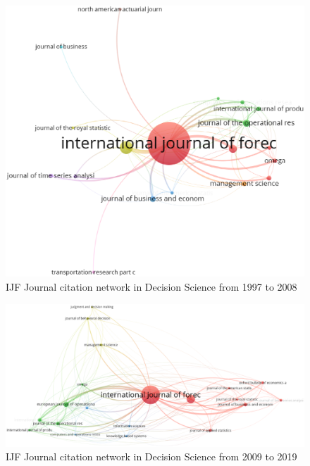\documentclass[11pt,a4paper]{elsarticle} %
\begin{document}
\begin{figure}[htbp]
\centering
\includegraphics[scale=0.4]{fig.15.eps}
\caption{IJF Journal citation network in Decision Science from 1997 to 2008}
\end{figure}

\begin{figure}[htbp]
\centering
\includegraphics[scale=0.3]{fig.16.eps}
\caption{IJF Journal citation network in Decision Science from 2009 to 2019 }
\end{figure}
\end{document}
